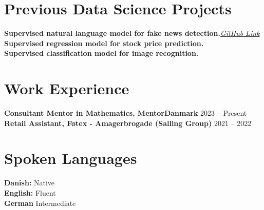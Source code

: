 \documentclass[a4paper,10pt]{article}
\begin{document}
\section*{Previous Data Science Projects}
\textbf{Supervised natural language model for fake news detection.}\quad \href{https://github.com/P1N60/gdsProjekt}{\textit{GitHub Link}} \\
\textbf{Supervised regression model for stock price prediction.} \\
\textbf{Supervised classification model for image recognition.}

\section*{Work Experience}
\textbf{Consultant Mentor in Mathematics, MentorDanmark} \hfill 2023 -- Present \\
\textbf{Retail Assistant, F\o tex - Amagerbrogade (Salling Group)} \hfill 2021 -- 2022

\section*{Spoken Languages}
\textbf{Danish:} Native \\
\textbf{English:} Fluent \\
\textbf{German} Intermediate
\end{document}

